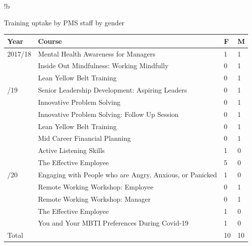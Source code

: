 \begin{tabbox}{!b}
\caption{Training uptake by PMS staff by gender}
\label{tab:training:pms}
\footnotesize 

    
\begin{tabular}{p{2cm}                
                p{9.5cm}
                !{\qquad}
                R{1cm}
                R{1cm}}
    
    \toprule 
    Year  & Course & F & M \\
    \midrule
    
    2017/18 & Mental Health Awareness for Managers & 1 & 1\\
    & Inside Out Mindfulness: Working Mindfully & 0 & 1\\
    & Lean Yellow Belt Training & 0 & 1\\
    /19 & Senior Leadership Development: Aspiring Leaders & 0 & 1\\
    & Innovative Problem Solving & 0 & 1 \\
    & Innovative Problem Solving: Follow Up Session & 0 & 1 \\
    & Lean Yellow Belt Training & 0 & 1 \\
    & Mid Career Financial Planning & 0 & 1 \\
    & Active Listening Skills & 1 & 0 \\
    & The Effective Employee & 5 & 0 \\
    /20 &  Engaging with People who are Angry, Anxious, or Panicked & 1 & 0\\
    & Remote Working Workshop: Employee & 0 & 1 \\
    & Remote Working Workshop: Manager  & 0 & 1 \\
    & The Effective Employee & 1 & 0 \\
    & You and Your MBTI Preferences During Covid-19 & 1 & 0 \\
    \midrule 
    Total & & 10 & 10 \\
    
\bottomrule      
         
\end{tabular}
    
\end{tabbox}